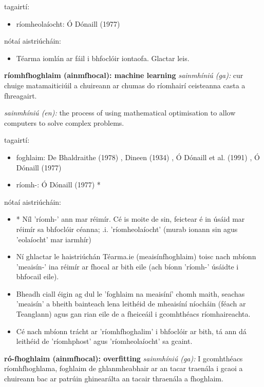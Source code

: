 \documentclass{article}
\begin{document}
tagairtí:
\begin{itemize}
	\item ríomheolaíocht: Ó Dónaill (1977) \cite{odonaill}
\end{itemize}

nótaí aistriúcháin:
\begin{itemize}
	\item Téarma iomlán ar fáil i bhfoclóir iontaofa. Glactar leis.
\end{itemize}


\textbf{ríomhfhoghlaim (ainmfhocal): machine learning}
\textit{sainmhíniú (ga):} cur chuige matamaiticiúil a chuireann ar chumas do ríomhairí ceisteanna casta a fhreagairt.

\textit{sainmhíniú (en):} the process of using mathematical optimisation to allow computers to solve complex problems.

tagairtí:
\begin{itemize}
	\item foghlaim: De Bhaldraithe (1978) \cite{de-bhaldraithe}, Dineen (1934) \cite{dineen}, Ó Dónaill et al. (1991) \cite{focloir-beag}, Ó Dónaill (1977) \cite{odonaill}
	\item ríomh-: Ó Dónaill (1977) \cite{odonaill}*
\end{itemize}

nótaí aistriúcháin:
\begin{itemize}
	\item * Níl 'ríomh-' ann mar réimír. Cé is moite de sin, feictear é in úsáid mar réimír sa bhfoclóir céanna; .i. 'ríomheolaíocht' (murab ionann sin agus 'eolaíocht' mar iarmhír)
	\item Ní ghlactar le haistriúchán Téarma.ie (meaisínfhoghlaim) toisc nach mbíonn 'meaisín-' ina réimír ar fhocal ar bith eile (ach bíonn 'ríomh-' úsáidte i bhfocail eile).
	\item Bheadh ciall éigin ag dul le 'foghlaim na meaisíní' chomh maith, seachas 'meaisín' a bheith bainteach lena leithéid de mheaisíní níocháin (féach ar Teanglann) agus gan rian eile de a fheiceáil i gcomhthéacs ríomhaireachta.
	\item Cé nach mbíonn trácht ar 'ríomhfhoghalim' i bhfoclóir ar bith, tá ann dá leithéid de 'ríomhphost' agus 'ríomheolaíocht' sa gcaint.
\end{itemize}


\textbf{ró-fhoghlaim (ainmfhocal): overfitting}
\textit{sainmhíniú (ga):} I gcomhthéacs ríomhfhoghlama, foghlaim de ghlanmheabhair ar an tacar traenála i gcaoi a chuireann bac ar patrúin ghinearálta an tacair thraenála a fhoghlaim.
\end{document}
